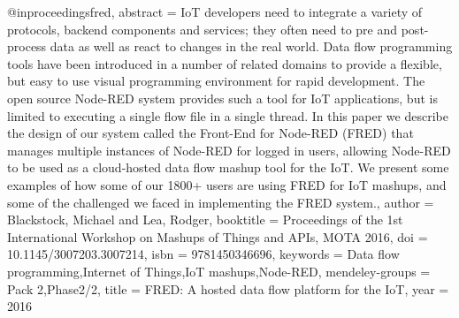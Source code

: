 @inproceedings{fred,
    abstract = {IoT developers need to integrate a variety of protocols, backend components and services; they often need to pre and post-process data as well as react to changes in the real world. Data flow programming tools have been introduced in a number of related domains to provide a flexible, but easy to use visual programming environment for rapid development. The open source Node-RED system provides such a tool for IoT applications, but is limited to executing a single flow file in a single thread. In this paper we describe the design of our system called the Front-End for Node-RED (FRED) that manages multiple instances of Node-RED for logged in users, allowing Node-RED to be used as a cloud-hosted data flow mashup tool for the IoT. We present some examples of how some of our 1800+ users are using FRED for IoT mashups, and some of the challenged we faced in implementing the FRED system.},
    author = {Blackstock, Michael and Lea, Rodger},
    booktitle = {Proceedings of the 1st International Workshop on Mashups of Things and APIs, MOTA 2016},
    doi = {10.1145/3007203.3007214},
    isbn = {9781450346696},
    keywords = {Data flow programming,Internet of Things,IoT mashups,Node-RED},
    mendeley-groups = {Pack 2,Phase2/2},
    title = {{FRED: A hosted data flow platform for the IoT}},
    year = {2016}
}

